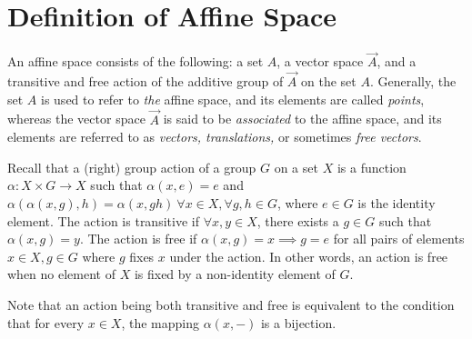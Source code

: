\documentclass[11pt]{article}
\begin{document}
\section{Definition of Affine Space}
An affine space consists of the following: a set $A$, a vector space $\vec{A}$, and a transitive and free action of the additive group of $\vec{A}$ on the set $A$. Generally, the set $A$ is used to refer to \emph{the} affine space, and its elements are called \emph{points}, whereas the vector space $\vec{A}$ is said to be \emph{associated} to the affine space, and its elements are referred to as \emph{vectors, translations,} or sometimes \emph{free vectors}.

Recall that a (right) group action of a group $G$ on a set $X$ is a function $\alpha: X \times G \to X$ such that $\alpha(x, e) = e$ and $\alpha(\alpha(x, g), h) = \alpha(x, gh) ~ \forall x \in X, \forall g, h \in G$, where $e \in G$ is the identity element. The action is transitive if $\forall x, y \in X$, there exists a $g \in G$ such that $\alpha(x, g) = y$. The action is free if $\alpha(x, g) = x \implies g = e$ for all pairs of elements $x \in X, g \in G$ where $g$ fixes $x$ under the action. In other words, an action is free when no element of $X$ is fixed by a non-identity element of $G$.

Note that an action being both transitive and free is equivalent to the condition that for every $x \in X$, the mapping $\alpha(x, -)$ is a bijection.
\end{document}
